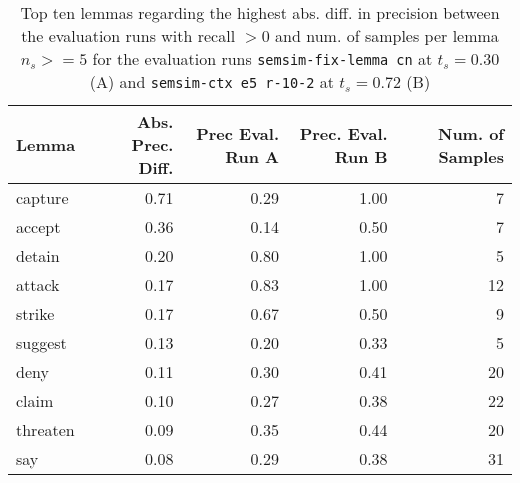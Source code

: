 \documentclass[11pt]{scrreprt}
\begin{document}
\begin{table}[ht]
\centering
\begin{tabular}{lrrrr}
\toprule
Lemma      & Abs. Prec. Diff. & Prec Eval. Run A & Prec. Eval. Run B & Num. of Samples \\
\midrule
capture    & 0.71	& 0.29	& 1.00	& 7 	\\
accept     & 0.36	& 0.14	& 0.50	& 7 	\\
detain     & 0.20	& 0.80	& 1.00	& 5 	\\
attack     & 0.17	& 0.83	& 1.00	& 12	\\
strike     & 0.17	& 0.67	& 0.50	& 9 	\\
suggest    & 0.13	& 0.20	& 0.33	& 5 	\\
deny       & 0.11	& 0.30	& 0.41	& 20 	\\
claim      & 0.10	& 0.27	& 0.38	& 22	\\
threaten   & 0.09	& 0.35	& 0.44	& 20	\\
say		   & 0.08 	& 0.29 	& 0.38  & 31\\
\bottomrule
\end{tabular}
\caption{Top ten lemmas regarding the highest abs. diff. in precision between the evaluation runs with recall \(> 0\) and num. of samples per lemma \(n_s >= 5\) for the evaluation runs \texttt{semsim-fix-lemma cn} at \(t_s = 0.30\) (A) and \texttt{semsim-ctx e5 r-10-2} at \(t_s = 0.72\) (B)}
\label{tab:predicate-lemma-highest-precision}
\end{table}
\end{document}
